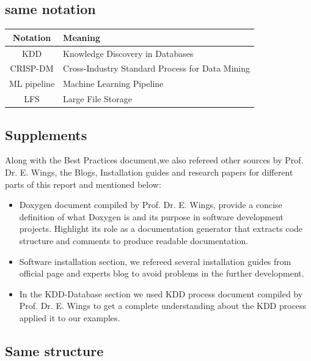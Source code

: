 \subsection{same notation}



		
		\begin{center}
		
			\begin{tabular}{|c|p{10cm}|} %
				\hline
				\textbf{Notation} & \textbf{Meaning} \\
				\hline
				KDD & Knowledge Discovery in Databases \\
				\hline
				CRISP-DM & Cross-Industry Standard Process for Data Mining \\
				\hline
				ML pipeline & Machine Learning Pipeline \\
				\hline
				LFS & Large File Storage \\
				\hline
			\end{tabular}
		\end{center}
		
\subsection{Supplements}
		
		Along with the Best Practices document,we also refereed other sources by Prof. Dr. E. Wings, the Blogs, Installation guides and research papers for different parts of this report and mentioned below:
		
		\begin{itemize}	
		\item Doxygen document compiled by Prof. Dr. E. Wings, provide a concise definition of what Doxygen is and its purpose in software development projects. Highlight its role as a documentation generator that extracts code structure and comments to produce readable documentation.
		\item Software installation section, we refereed several installation guides
		from official page and experts blog to avoid problems in the further
		development.
		\item In the KDD-Database section we used KDD process document compiled by Prof. Dr. E. Wings to get a complete understanding about the KDD process applied it to our examples.
			\end{itemize}
		\subsection{Same structure}
		
